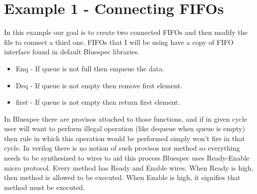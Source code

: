 \documentclass[12pt]{report}
\begin{document}
\section{Example 1 - Connecting FIFOs}
In this example our goal is to create two connected FIFOs and then modify the file to connect a third one. FIFOs that I will be using have a copy of FIFO interface found in default Bluespec libraries.
\begin{itemize}
    \item Enq - If queue is not full then enqueue the data.
    \item Deq - If queue is not empty then remove first element.
    \item first - If queue is not empty then return first element.
\end{itemize}
In Bluespec there are provisos attached to those functions, and if in given cycle user will want to perform illegal operation (like dequeue when queue is empty) then rule in which this operation would be performed simply won't fire in that cycle. In verilog there is no notion of such provisos nor method so everything needs to be synthesized to wires to aid this process Bluespec uses Ready-Enable micro protocol. Every method has Ready and Enable wires. When Ready is high, then method is allowed to be executed. When Enable is high, it signifies that method must be executed.
\end{document}
